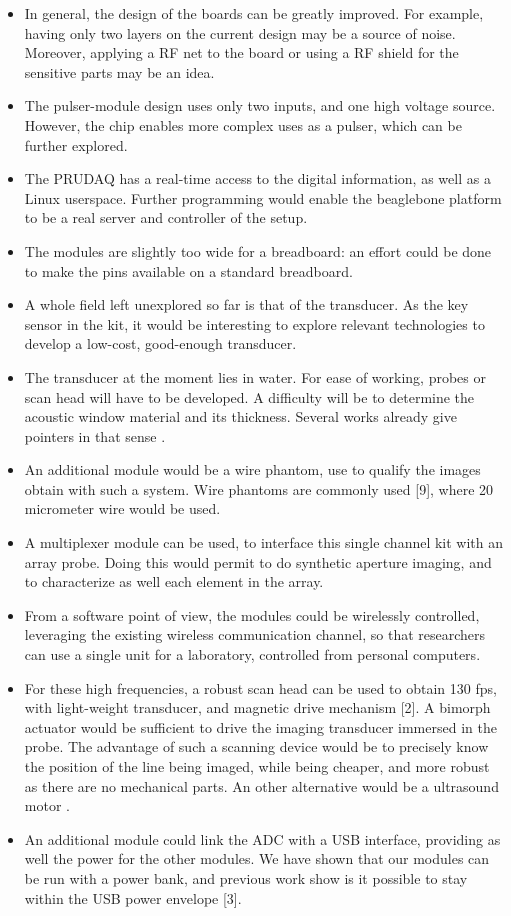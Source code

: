 \documentclass[letterpaper, 10 pt, conference]{ieeeconf} %
\begin{document}
\begin{itemize}
\item In general, the design of the boards can be greatly improved. For example, having only two layers on the current design may be a source of noise. Moreover, applying a RF net to the board or using a RF shield for the sensitive parts may be an idea.
\item The pulser-module design uses only two inputs, and one high voltage source. However, the chip enables more complex uses as a pulser, which can be further explored.
\item The PRUDAQ has a real-time access to the digital information, as well as a Linux userspace. Further programming would enable the beaglebone platform to be a real server and controller of the setup.
\item The modules are slightly too wide for a breadboard: an effort could be done to make the pins available on a standard breadboard.
\item A whole field left unexplored so far is that of the transducer. As the key sensor in the kit, it would be interesting to explore relevant technologies to develop a low-cost, good-enough transducer.
\item The transducer at the moment lies in water. For ease of working, probes or scan head will have to be developed. A difficulty will be to determine the acoustic window material and its thickness. Several works already give pointers in that sense \cite{c1}.
\item An additional module would be a wire phantom, use to qualify the images obtain with such a system. Wire phantoms are commonly used [9], where 20 micrometer wire would be used.
\item A multiplexer module can be used, to interface this single channel kit with an array probe. Doing this would permit to do synthetic aperture imaging, and to characterize as well each element in the array.
\item From a software point of view, the modules could be wirelessly controlled, leveraging the existing wireless communication channel, so that researchers can use a single unit for a laboratory, controlled from personal computers.
\item For these high frequencies, a robust scan head can be used to obtain 130 fps, with light-weight transducer, and magnetic drive mechanism [2]. A bimorph actuator would be sufficient to drive the imaging transducer \cite{c4,c5} immersed in the probe. The advantage of such a scanning device would be to precisely know the position of the line being imaged, while being cheaper, and more robust as there are no mechanical parts. An other alternative would be a ultrasound motor \cite{c6}.
\item An additional module could link the ADC with a USB interface, providing as well the power for the other modules. We have shown that our modules can be run with a power bank, and previous work show is it possible to stay within the USB power envelope [3].
\end{itemize}
\end{document}
